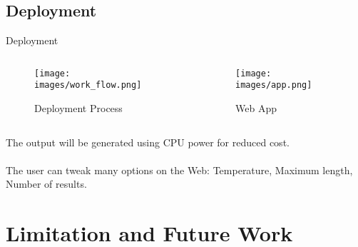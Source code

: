 \documentclass[10pt]{beamer}
\begin{document}
\subsection{Deployment}

\begin{frame}{Deployment}

\begin{columns}[T]
\begin{column}{5cm}

\begin{figure}
    \centering    \texttt{[image: images/work\_flow.png]}
    \caption{Deployment Process}
    \label{fig:work_flow}
\end{figure}

\end{column}
\begin{column}{5cm}

\begin{figure}
    \centering    \texttt{[image: images/app.png]}
    \caption{Web App}
    \label{fig:app}
\end{figure}

\end{column}
\end{columns}
\pause
The output will be generated using \alert{CPU power} for reduced cost. \\~\\
\pause
The user can tweak many options on the Web: Temperature, Maximum length, Number of results.
\end{frame}


\section{Limitation and Future Work}%


\end{document}
